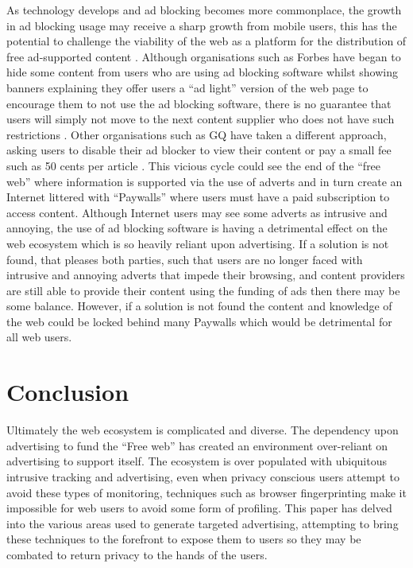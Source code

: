 \documentclass{article}
\begin{document}
As technology develops and ad blocking becomes more commonplace, the growth in ad blocking usage may receive a sharp growth from mobile users,  this has the potential to challenge the viability of the web as a platform for the distribution of free ad-supported content \parencite{adobeAdBlock}. Although organisations such as Forbes have began to hide some content from users who are using ad blocking software whilst showing banners explaining they offer users a ``ad light'' version of the web page to encourage them to not use the ad blocking software, there is no guarantee that users will simply not move to the next content supplier who does not have such restrictions \parencite{publishersWeb}. Other organisations such as GQ have taken a different approach, asking users to disable their ad blocker to view their content or pay a small fee such as 50 cents per article \parencite{gq}.  This vicious cycle could see the end of the ``free web'' where information is supported via the use of adverts and in turn create an Internet littered with ``Paywalls'' where users must have a paid subscription to access content. Although Internet users may see some adverts as intrusive and annoying, the use of ad blocking software is having a detrimental effect on the web ecosystem which is so heavily reliant upon advertising. If a solution is not found, that pleases both parties, such that users are no longer faced with intrusive and annoying adverts that impede their browsing, and content providers are still able to provide their content using the funding of ads then there may be some balance. However, if a solution is not found the content and knowledge of the web could be locked behind many Paywalls which would be detrimental for all web users. \\

\section{Conclusion}
Ultimately the web ecosystem is complicated and diverse. The dependency upon advertising to fund the ``Free web'' has created an environment over-reliant on advertising to support itself. The ecosystem is over populated with ubiquitous intrusive tracking and advertising, even when privacy conscious users attempt to avoid these types of monitoring, techniques such as browser fingerprinting make it impossible for web users to avoid some form of profiling. This paper has delved into the various areas used to generate targeted advertising, attempting to bring these techniques to the forefront to expose them to users so they may be combated to return privacy to the hands of the users. \\
\end{document}

